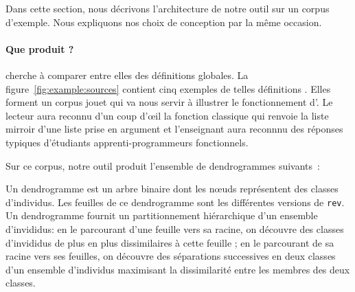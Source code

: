 Dans cette section, nous décrivons l'architecture de notre outil sur
un corpus d'exemple. Nous expliquons nos choix de conception par la
même occasion.



\paragraph{Que produit {\Asak}?}
{\Asak} cherche à comparer entre elles des définitions globales.  La
figure~\ref{fig:example:sources} contient cinq exemples de telles
définitions {\OCaml}. Elles forment un corpus jouet qui va nous servir
à illustrer le fonctionnement d'{\Asak}.  Le lecteur aura reconnu d'un
coup d'{\oe}il la fonction classique qui renvoie la liste mirroir
d'une liste prise en argument et l'enseignant aura reconnnu des
réponses typiques d'étudiants apprenti-programmeurs fonctionnels.

Sur ce corpus, notre outil produit l'ensemble de dendrogrammes suivants~:

\begin{center}
\end{center}

Un dendrogramme est un arbre binaire dont les n{\oe}uds représentent
des classes d'individus. Les feuilles de ce dendrogramme sont les
différentes versions de \texttt{rev}. Un dendrogramme fournit un
partitionnement hiérarchique d'un ensemble d'invididus: en le
parcourant d'une feuille vers sa racine, on découvre des classes
d'invididus de plus en plus dissimilaires à cette feuille ; en le
parcourant de sa racine vers ses feuilles, on découvre des séparations
successives en deux classes d'un ensemble d'individus maximisant
la dissimilarité entre les membres des deux classes.  

